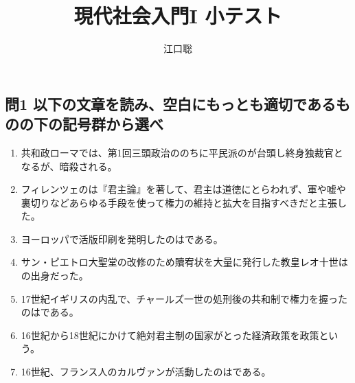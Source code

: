 \documentclass[uplatex,dvipdfmx]{jsarticle}
\author{江口聡}
\title{現代社会入門I 小テスト}
\begin{document}
\maketitle

\subsection*{問1 以下の文章を読み、空白にもっとも適切であるものの下の記号群から選べ }

\begin{enumerate}

\setlength{\parskip}{.9zw}
\setlength{\itemsep}{.9zw}







  

  
  
  
\item 共和政ローマでは、第1回三頭政治ののちに平民派のが台頭し終身独裁官となるが、暗殺される。



\item フィレンツェのは『君主論』を著して、君主は道徳にとらわれず、軍や嘘や裏切りなどあらゆる手段を使って権力の維持と拡大を目指すべきだと主張した。
  
\item ヨーロッパで活版印刷を発明したのはである。

\item サン・ピエトロ大聖堂の改修のため贖宥状を大量に発行した教皇レオ十世はの出身だった。
  
\item 17世紀イギリスの内乱で、チャールズ一世の処刑後の共和制で権力を握ったのはである。

  
\item 16世紀から18世紀にかけて絶対君主制の国家がとった経済政策を政策という。
  
\item 16世紀、フランス人のカルヴァンが活動したのはである。
  

\end{enumerate}
\end{document}

